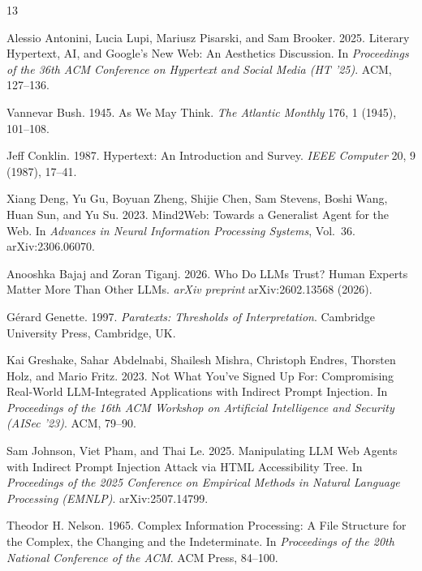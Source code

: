 \documentclass[sigconf,authordraft]{acmart}
\begin{document}
\begin{thebibliography}{13}

Alessio Antonini, Lucia Lupi, Mariusz Pisarski, and Sam Brooker. 2025.
Literary Hypertext, AI, and Google's New Web: An Aesthetics Discussion.
In \textit{Proceedings of the 36th ACM Conference on Hypertext and Social
Media (HT '25)}. ACM, 127--136.
\newblock {}


Vannevar Bush. 1945.
As We May Think.
\textit{The Atlantic Monthly} 176, 1 (1945), 101--108.

Jeff Conklin. 1987.
Hypertext: An Introduction and Survey.
\textit{IEEE Computer} 20, 9 (1987), 17--41.
\newblock {}

Xiang Deng, Yu Gu, Boyuan Zheng, Shijie Chen, Sam Stevens, Boshi Wang,
Huan Sun, and Yu Su. 2023.
Mind2Web: Towards a Generalist Agent for the Web.
In \textit{Advances in Neural Information Processing Systems}, Vol.~36.
arXiv:2306.06070.

Anooshka Bajaj and Zoran Tiganj. 2026.
Who Do LLMs Trust? Human Experts Matter More Than Other LLMs.
\textit{arXiv preprint} arXiv:2602.13568 (2026).

G\'{e}rard Genette. 1997.
\textit{Paratexts: Thresholds of Interpretation}.
Cambridge University Press, Cambridge, UK.
\newblock {}

Kai Greshake, Sahar Abdelnabi, Shailesh Mishra, Christoph Endres,
Thorsten Holz, and Mario Fritz. 2023.
Not What You've Signed Up For: Compromising Real-World LLM-Integrated
Applications with Indirect Prompt Injection.
In \textit{Proceedings of the 16th ACM Workshop on Artificial Intelligence
and Security (AISec '23)}. ACM, 79--90.
\newblock {}

Sam Johnson, Viet Pham, and Thai Le. 2025.
Manipulating LLM Web Agents with Indirect Prompt Injection Attack via HTML
Accessibility Tree.
In \textit{Proceedings of the 2025 Conference on Empirical Methods in
Natural Language Processing (EMNLP)}. arXiv:2507.14799.

Theodor H. Nelson. 1965.
Complex Information Processing: A File Structure for the Complex, the
Changing and the Indeterminate.
In \textit{Proceedings of the 20th National Conference of the ACM}.
ACM Press, 84--100.


\end{thebibliography}
\end{document}
